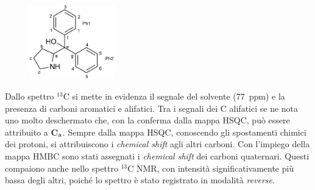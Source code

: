 \documentclass[a4paper, italian, oneside, 12pt]{article}
\begin{document}
\begin{figure}\vspace{-28pt}
  \begin{center}
    \includegraphics[width=0.33\textwidth]{img/A3.png}
  \end{center}\vspace{-20pt}
\end{figure}
Dallo spettro $^{13}$C si mette in evidenza il segnale del solvente  (77~ppm) e la presenza di carboni aromatici e alifatici. Tra i segnali dei C alifatici se ne nota uno molto deschermato che, con la conferma dalla mappa HSQC, può essere attribuito a {\bf{C$_{\textrm a}$}}. Sempre dalla mappa HSQC, conoscendo gli spostamenti chimici dei protoni, si attribuiscono i {\emph{chemical shift}} agli altri carboni. Con l'impiego della mappa HMBC sono stati assegnati i {\emph{chemical shift}} dei carboni quaternari. Questi compaiono anche nello spettro $^{13}$C NMR, con intensità significativamente più bassa degli altri, poiché lo spettro è stato registrato in modalità {\emph{reverse}}.
\end{document}
